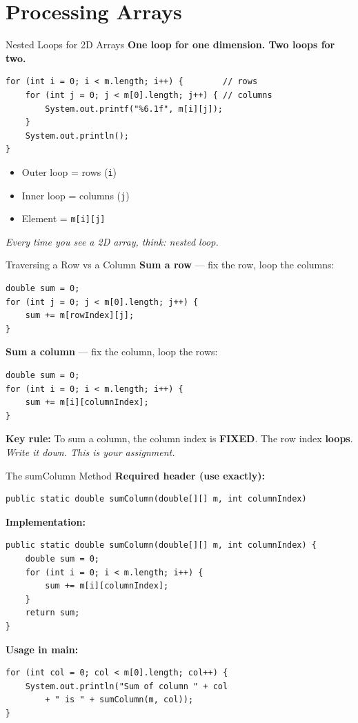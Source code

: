 \documentclass{beamer}
\begin{document}
\section{Processing Arrays}
\begin{frame}[fragile]{Nested Loops for 2D Arrays}
\textbf{One loop for one dimension. Two loops for two.}
\begin{lstlisting}
for (int i = 0; i < m.length; i++) {        // rows
    for (int j = 0; j < m[0].length; j++) { // columns
        System.out.printf("%6.1f", m[i][j]);
    }
    System.out.println();
}
\end{lstlisting}
\vspace{0.3cm}
\begin{itemize}
  \item Outer loop = rows (\texttt{i})
  \item Inner loop = columns (\texttt{j})
  \item Element = \texttt{m[i][j]}
\end{itemize}
\vspace{0.2cm}
\textit{Every time you see a 2D array, think: nested loop.}
\end{frame}
\begin{frame}[fragile]{Traversing a Row vs a Column}
\textbf{Sum a row} --- fix the row, loop the columns:
\begin{lstlisting}
double sum = 0;
for (int j = 0; j < m[0].length; j++) {
    sum += m[rowIndex][j];
}
\end{lstlisting}
\vspace{0.3cm}
\textbf{Sum a column} --- fix the column, loop the rows:
\begin{lstlisting}
double sum = 0;
for (int i = 0; i < m.length; i++) {
    sum += m[i][columnIndex];
}
\end{lstlisting}
\vspace{0.3cm}
\textbf{Key rule:} To sum a column, the column index is \textbf{FIXED}. The row index \textbf{loops}.\\
\vspace{0.2cm}
\textit{Write it down. This is your assignment.}
\end{frame}
\begin{frame}[fragile]{The sumColumn Method}
\textbf{Required header (use exactly):}
\begin{lstlisting}
public static double sumColumn(double[][] m, int columnIndex)
\end{lstlisting}
\vspace{0.3cm}
\textbf{Implementation:}
\begin{lstlisting}
public static double sumColumn(double[][] m, int columnIndex) {
    double sum = 0;
    for (int i = 0; i < m.length; i++) {
        sum += m[i][columnIndex];
    }
    return sum;
}
\end{lstlisting}
\vspace{0.3cm}
\textbf{Usage in main:}
\begin{lstlisting}
for (int col = 0; col < m[0].length; col++) {
    System.out.println("Sum of column " + col
        + " is " + sumColumn(m, col));
}
\end{lstlisting}
\end{frame}
\end{document}
